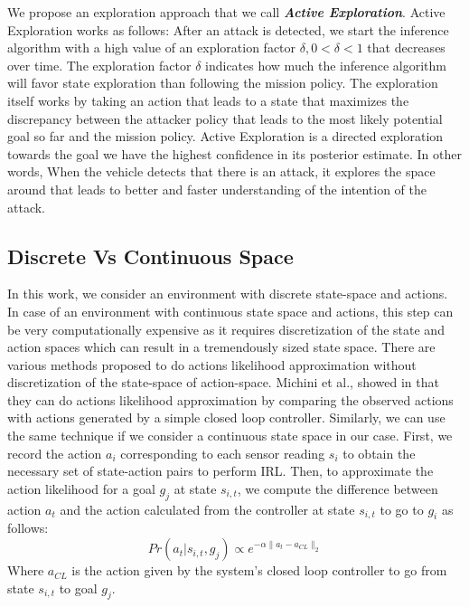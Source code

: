 \documentclass[conference]{IEEEtran}
\begin{document}
We propose an exploration approach that we call \textbf{\textit{Active Exploration}}. Active Exploration works as follows: After an attack is detected, we start the inference algorithm with a high value of an exploration factor $\delta, 0 < \delta < 1$ that decreases over time. The exploration factor $\delta$ indicates how much the inference algorithm will favor state exploration than following the mission policy. The exploration itself works by taking an action that leads to a state that maximizes the discrepancy between the attacker policy that leads to the most likely potential goal so far and the mission policy. Active Exploration is a directed exploration towards the goal we have the highest confidence in its posterior estimate. In other words, When the vehicle detects that there is an attack, it explores the space around that leads to better and faster understanding of the intention of the attack.

\subsection{Discrete Vs Continuous Space}
In this work, we consider an  environment with discrete state-space and actions. In case of an environment with continuous state space and actions, this step can be very computationally expensive as it requires discretization of the state and action spaces which can result in a tremendously sized state space. There are various methods proposed to do actions likelihood approximation without discretization of the state-space of action-space. Michini et al., showed in \cite{Michini2013} that they can do actions likelihood approximation by comparing the observed actions with actions generated by a simple closed loop controller. Similarly, we can use the same technique if we consider a continuous state space in our case. First, we record the action $a_i$ corresponding to each sensor reading $s_i$ to obtain the necessary set of state-action pairs to perform IRL. Then, to approximate the action likelihood for a goal $g_j$ at state $s_{i,t}$, we compute the difference between action $a_t$ and the action calculated from the controller at state $s_{i,t}$ to go to $g_i$ as follows:
\begin{equation}
 Pr(a_t|s_{i,t},g_j) \propto e^{-\alpha \lVert a_t - a_{CL} \rVert_{2}}
\end{equation}
Where $a_{CL}$ is the action given by the system's closed loop controller to go from state $s_{i,t}$ to goal $g_j$.
\end{document}
